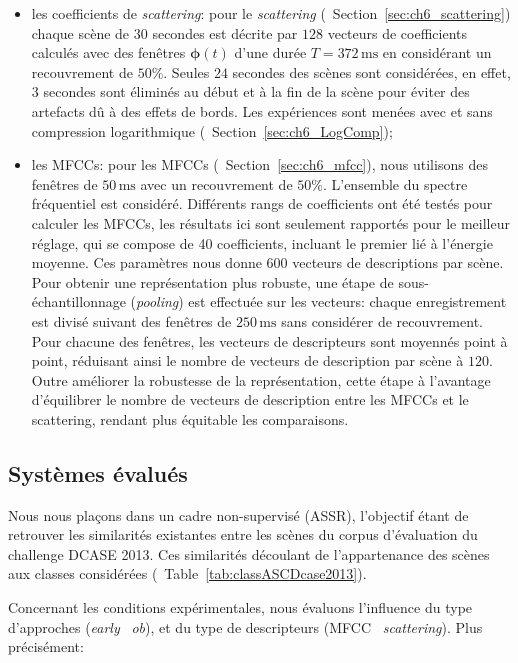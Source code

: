 \begin{itemize}
\item les coefficients de \emph{scattering}: pour le \emph{scattering} (\cf~Section~\ref{sec:ch6_scattering}) chaque scène de $30$ secondes est décrite par $128$ vecteurs de coefficients calculés avec des fenêtres $\boldsymbol{\phi}(t)$ d'une durée $T=372\,\mathrm{ms}$ en considérant un recouvrement de $50\%$. Seules $24$ secondes des scènes sont considérées, en effet, $3$ secondes sont éliminés au début et à la fin de la scène pour éviter des artefacts dû à des effets de bords. Les expériences sont menées avec et sans compression logarithmique (\cf~Section~\ref{sec:ch6_LogComp});
\item les MFCCs:  pour les MFCCs (\cf~Section~\ref{sec:ch6_mfcc}), nous utilisons des fenêtres de $50\,\mathrm{ms}$ avec un recouvrement de $50\%$. L'ensemble du spectre fréquentiel est considéré. Différents rangs de coefficients ont été testés pour calculer les MFCCs, les résultats ici sont seulement rapportés pour le meilleur réglage, qui se compose de 40 coefficients, incluant le premier lié à l'énergie moyenne. Ces paramètres nous donne $600$ vecteurs de descriptions par scène. Pour obtenir une représentation plus robuste, une étape de sous-échantillonnage (\emph{pooling}) est effectuée sur les vecteurs\citep{Tzanetakis2002musical}: chaque enregistrement est divisé suivant des fenêtres de $250\,\mathrm{ms}$ sans considérer de recouvrement. Pour chacune des fenêtres, les vecteurs de descripteurs sont moyennés point à point, réduisant ainsi le nombre de vecteurs de description par scène à $120$. Outre améliorer la robustesse de la représentation, cette étape à l'avantage d'équilibrer le nombre de vecteurs de description entre les MFCCs et le scattering, rendant plus équitable les comparaisons.
\end{itemize}

\subsection{Systèmes évalués}

Nous nous plaçons dans un cadre non-supervisé  (ASSR), l'objectif étant de retrouver les similarités existantes entre les scènes du corpus d'évaluation du challenge DCASE 2013. Ces similarités découlant de l'appartenance des scènes aux classes considérées (\cf~Table~\ref{tab:classASCDcase2013}).

Concernant les conditions expérimentales, nous évaluons l'influence du type d'approches (\emph{early} \vs~\emph{ob}), et du type de descripteurs (MFCC \vs~\emph{scattering}). Plus précisément:


